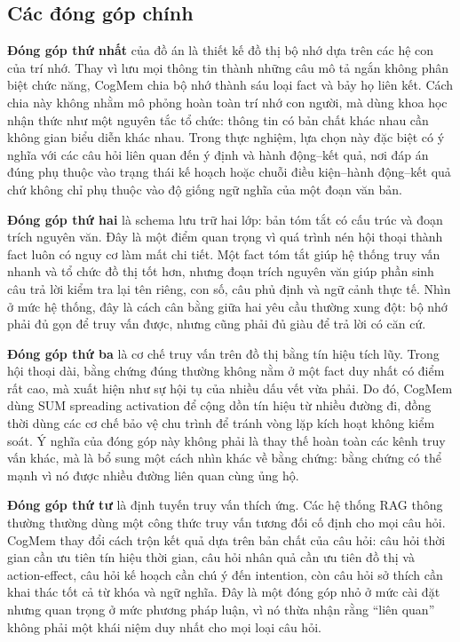 \documentclass[../main.tex]{subfiles}
\begin{document}
\subsection{Các đóng góp chính}

\textbf{Đóng góp thứ nhất} của đồ án là thiết kế đồ thị bộ nhớ dựa trên các hệ con của trí nhớ. Thay vì lưu mọi thông tin thành những câu mô tả ngắn không phân biệt chức năng, CogMem chia bộ nhớ thành sáu loại fact và bảy họ liên kết. Cách chia này không nhằm mô phỏng hoàn toàn trí nhớ con người, mà dùng khoa học nhận thức như một nguyên tắc tổ chức: thông tin có bản chất khác nhau cần không gian biểu diễn khác nhau. Trong thực nghiệm, lựa chọn này đặc biệt có ý nghĩa với các câu hỏi liên quan đến ý định và hành động--kết quả, nơi đáp án đúng phụ thuộc vào trạng thái kế hoạch hoặc chuỗi điều kiện--hành động--kết quả chứ không chỉ phụ thuộc vào độ giống ngữ nghĩa của một đoạn văn bản.

\textbf{Đóng góp thứ hai} là schema lưu trữ hai lớp: bản tóm tắt có cấu trúc và đoạn trích nguyên văn. Đây là một điểm quan trọng vì quá trình nén hội thoại thành fact luôn có nguy cơ làm mất chi tiết. Một fact tóm tắt giúp hệ thống truy vấn nhanh và tổ chức đồ thị tốt hơn, nhưng đoạn trích nguyên văn giúp phần sinh câu trả lời kiểm tra lại tên riêng, con số, câu phủ định và ngữ cảnh thực tế. Nhìn ở mức hệ thống, đây là cách cân bằng giữa hai yêu cầu thường xung đột: bộ nhớ phải đủ gọn để truy vấn được, nhưng cũng phải đủ giàu để trả lời có căn cứ.

\textbf{Đóng góp thứ ba} là cơ chế truy vấn trên đồ thị bằng tín hiệu tích lũy. Trong hội thoại dài, bằng chứng đúng thường không nằm ở một fact duy nhất có điểm rất cao, mà xuất hiện như sự hội tụ của nhiều dấu vết vừa phải. Do đó, CogMem dùng SUM spreading activation để cộng dồn tín hiệu từ nhiều đường đi, đồng thời dùng các cơ chế bảo vệ chu trình để tránh vòng lặp kích hoạt không kiểm soát. Ý nghĩa của đóng góp này không phải là thay thế hoàn toàn các kênh truy vấn khác, mà là bổ sung một cách nhìn khác về bằng chứng: bằng chứng có thể mạnh vì nó được nhiều đường liên quan cùng ủng hộ.

\textbf{Đóng góp thứ tư} là định tuyến truy vấn thích ứng. Các hệ thống RAG thông thường thường dùng một công thức truy vấn tương đối cố định cho mọi câu hỏi. CogMem thay đổi cách trộn kết quả dựa trên bản chất của câu hỏi: câu hỏi thời gian cần ưu tiên tín hiệu thời gian, câu hỏi nhân quả cần ưu tiên đồ thị và action-effect, câu hỏi kế hoạch cần chú ý đến intention, còn câu hỏi sở thích cần khai thác tốt cả từ khóa và ngữ nghĩa. Đây là một đóng góp nhỏ ở mức cài đặt nhưng quan trọng ở mức phương pháp luận, vì nó thừa nhận rằng ``liên quan'' không phải một khái niệm duy nhất cho mọi loại câu hỏi.
\end{document}
